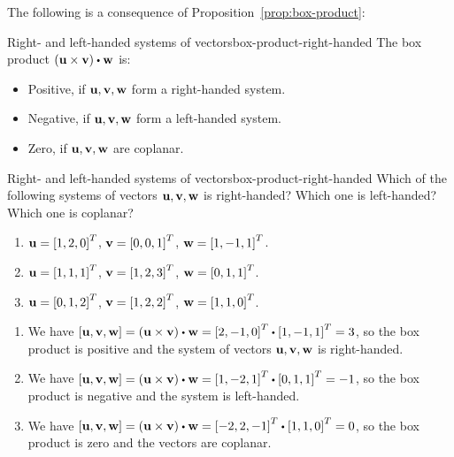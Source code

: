 The following is a consequence of Proposition~\ref{prop:box-product}:

\begin{corollary}{Right- and left-handed systems of vectors}{box-product-right-handed}
  The box product $(\vect{u}\times\vect{v}) \dotprod \vect{w}$ is:
  \begin{itemize}
  \item Positive, if $\vect{u},\vect{v},\vect{w}$ form a right-handed system.
  \item Negative, if $\vect{u},\vect{v},\vect{w}$ form a left-handed system.
  \item Zero, if $\vect{u},\vect{v},\vect{w}$ are coplanar.
  \end{itemize}
\end{corollary}

\begin{example}{Right- and left-handed systems of vectors}{box-product-right-handed}
  Which of the following systems of vectors
  $\vect{u},\vect{v},\vect{w}$ is right-handed? Which one is left-handed?
  Which one is coplanar?
  \begin{enumialphparenastyle}
    \begin{enumerate}
    \item $\vect{u}=\mat{1,2,0}^T$, $\vect{v}=\mat{0,0,1}^T$, $\vect{w}=\mat{1,-1,1}^T$.
    \item $\vect{u}=\mat{1,1,1}^T$, $\vect{v}=\mat{1,2,3}^T$, $\vect{w}=\mat{0,1,1}^T$.
    \item $\vect{u}=\mat{0,1,2}^T$, $\vect{v}=\mat{1,2,2}^T$, $\vect{w}=\mat{1,1,0}^T$.
    \end{enumerate}
  \end{enumialphparenastyle}
\end{example}

\begin{solution}
  \begin{enumialphparenastyle}
    \begin{enumerate}
    \item We have
      $\boxprod{\vect{u},\vect{v},\vect{w}} = (\vect{u}\times\vect{v})
      \dotprod \vect{w} = \mat{2,-1,0}^T\dotprod\mat{1,-1,1}^T=3$, so
      the box product is positive and the system of vectors
      $\vect{u},\vect{v},\vect{w}$ is right-handed.
    \item We have
      $\boxprod{\vect{u},\vect{v},\vect{w}} = (\vect{u}\times\vect{v})
      \dotprod \vect{w} = \mat{1,-2,1}^T\dotprod\mat{0,1,1}^T=-1$, so
      the box product is negative and the system is left-handed.
    \item We have
      $\boxprod{\vect{u},\vect{v},\vect{w}} = (\vect{u}\times\vect{v})
      \dotprod \vect{w} = \mat{-2,2,-1}^T\dotprod\mat{1,1,0}^T=0$, so
      the box product is zero and the vectors are coplanar.
    \end{enumerate}
  \end{enumialphparenastyle}
\end{solution}


